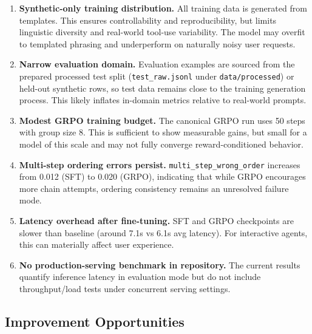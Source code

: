 \documentclass[12pt, a4paper]{article}
\begin{document}
\begin{enumerate}[leftmargin=1.5em, itemsep=6pt]
  \item \textbf{Synthetic-only training distribution.}
    All training data is generated from templates. This ensures controllability
    and reproducibility, but limits linguistic diversity and real-world tool-use
    variability. The model may overfit to templated phrasing and underperform on
    naturally noisy user requests.

  \item \textbf{Narrow evaluation domain.}
    Evaluation examples are sourced from the prepared processed test split
    (\texttt{test\_raw.jsonl} under \texttt{data/processed}) or held-out
    synthetic rows, so test data remains close to the training generation
    process. This likely inflates in-domain metrics relative to real-world
    prompts.

  \item \textbf{Modest GRPO training budget.}
    The canonical GRPO run uses 50 steps with group size 8. This is sufficient
    to show measurable gains, but small for a model of this scale and may not
    fully converge reward-conditioned behavior.

  \item \textbf{Multi-step ordering errors persist.}
    \texttt{multi\_step\_wrong\_order} increases from 0.012 (SFT) to 0.020 (GRPO),
    indicating that while GRPO encourages more chain attempts, ordering
    consistency remains an unresolved failure mode.

  \item \textbf{Latency overhead after fine-tuning.}
    SFT and GRPO checkpoints are slower than baseline (around 7.1s vs 6.1s avg
    latency). For interactive agents, this can materially affect user
    experience.

  \item \textbf{No production-serving benchmark in repository.}
    The current results quantify inference latency in evaluation mode but do not
    include throughput/load tests under concurrent serving settings.
\end{enumerate}

\subsection{Improvement Opportunities}
\end{document}
